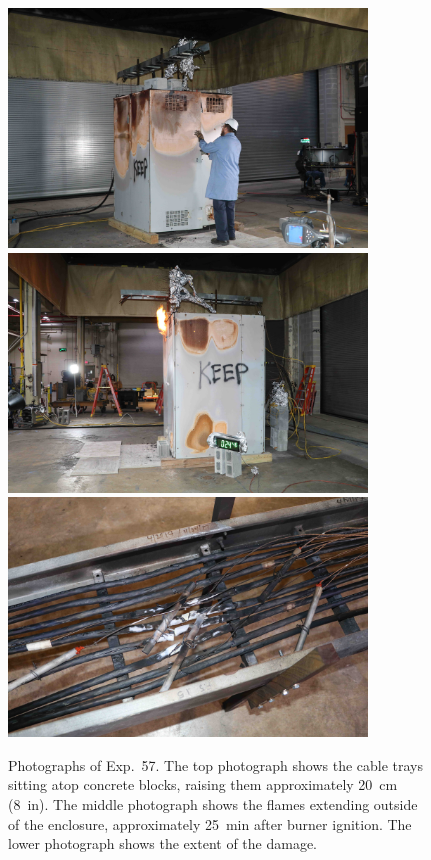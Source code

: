 \begin{figure}[p]
\centering
\includegraphics[height=2.50in]{../FIGURES/Test_57_setup} \\  \vspace{0.1in}
\includegraphics[height=2.50in]{../FIGURES/Test_57_24_min_46_s} \\  \vspace{0.1in}
\includegraphics[height=2.50in]{../FIGURES/Test_57_scar}
\caption[Photographs of Exp.~57]{Photographs of Exp.~57. The top photograph shows the cable trays sitting atop concrete blocks, raising them approximately 20~cm (8~in). The middle photograph shows the flames extending outside of the enclosure, approximately 25~min after burner ignition. The lower photograph shows the extent of the damage.}
\label{fig:Test_57_photos}
\end{figure}


